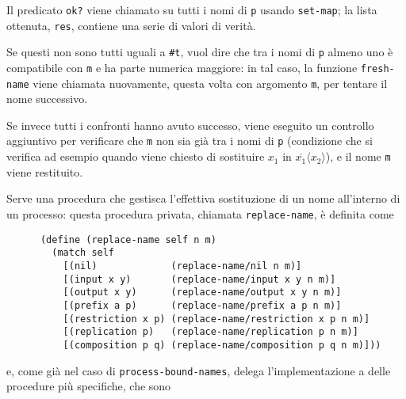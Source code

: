 Il predicato \lstinline{ok?} viene chiamato su tutti i nomi di \lstinline{p}
usando \lstinline{set-map}; la lista ottenuta, \lstinline{res}, contiene
una serie di valori di verit\`a.

Se questi non sono tutti uguali a \lstinline{#t}, vuol dire che tra i nomi
di \lstinline{p} almeno uno \`e compatibile con \lstinline{m} e ha parte
numerica maggiore: in tal caso, la funzione \lstinline{fresh-name} viene
chiamata nuovamente, questa volta con argomento \lstinline{m}, per tentare
il nome successivo.

Se invece tutti i confronti hanno avuto successo, viene eseguito un
controllo aggiuntivo per verificare che \lstinline{m} non sia gi\`a tra
i nomi di \lstinline{p} (condizione che si verifica ad esempio quando viene
chiesto di sostituire $x_1$ in $\overline{x_1}\langle x_2\rangle$), e il
nome \lstinline{m} viene restituito.

Serve una procedura che gestisca l'effettiva sostituzione di un nome
all'interno di un processo: questa procedura privata, chiamata
\lstinline{replace-name}, \`e definita come

\begin{lstlisting}
      (define (replace-name self n m)
        (match self
          [(nil)             (replace-name/nil n m)]
          [(input x y)       (replace-name/input x y n m)]
          [(output x y)      (replace-name/output x y n m)]
          [(prefix a p)      (replace-name/prefix a p n m)]
          [(restriction x p) (replace-name/restriction x p n m)]
          [(replication p)   (replace-name/replication p n m)]
          [(composition p q) (replace-name/composition p q n m)]))
\end{lstlisting}

e, come gi\`a nel caso di \lstinline{process-bound-names}, delega
l'implementazione a delle procedure pi\`u specifiche, che sono

